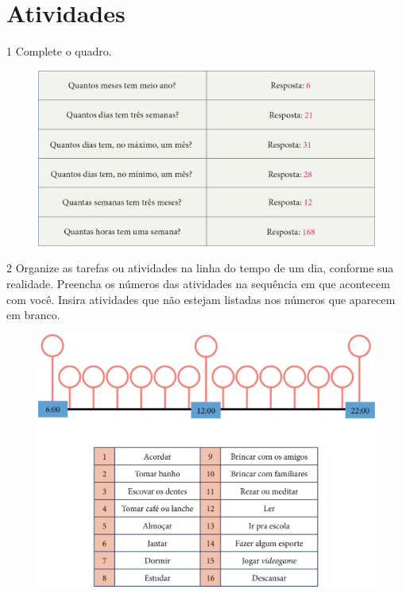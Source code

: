 \section*{Atividades}

\num{1} Complete o quadro.

\begin{figure}[htpb!]
\centering
\includegraphics[width=.9\textwidth]{./media/image50.png}
\end{figure}

\pagebreak
\num{2} Organize as tarefas ou atividades na linha do tempo de um dia, conforme
sua realidade. Preencha os números das atividades na sequência em que acontecem com você. Insira atividades que não estejam listadas nos números que aparecem em branco.

\begin{figure}[htpb!]
\includegraphics[width=\textwidth]{./media/image51.png}
\end{figure}


